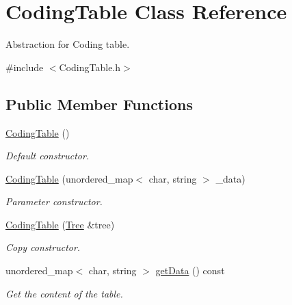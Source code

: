 \hypertarget{class_coding_table}{}\section{Coding\+Table Class Reference}
\label{class_coding_table}


Abstraction for Coding table.  




{\ttfamily \#include $<$Coding\+Table.\+h$>$}

\subsection*{Public Member Functions}
\begin{DoxyCompactItemize}
\item 
\mbox{\label{class_coding_table_aa084c590397a28dce6a1f30debb679af}} 
\mbox{\hyperlink{class_coding_table_aa084c590397a28dce6a1f30debb679af}{Coding\+Table}} ()
\begin{DoxyCompactList}\small\item\em Default constructor. \end{DoxyCompactList}\item 
\mbox{\label{class_coding_table_a9a0bd4c15ee8cc2f87c87835e56cc52f}} 
\mbox{\hyperlink{class_coding_table_a9a0bd4c15ee8cc2f87c87835e56cc52f}{Coding\+Table}} (unordered\+\_\+map$<$ char, string $>$ \+\_\+data)
\begin{DoxyCompactList}\small\item\em Parameter constructor. \end{DoxyCompactList}\item 
\mbox{\label{class_coding_table_a1bd8e80f18829b64f50abc1260a5273c}} 
\mbox{\hyperlink{class_coding_table_a1bd8e80f18829b64f50abc1260a5273c}{Coding\+Table}} (\mbox{\hyperlink{class_tree}{Tree}} \&tree)
\begin{DoxyCompactList}\small\item\em Copy constructor. \end{DoxyCompactList}\item 
unordered\+\_\+map$<$ char, string $>$ \mbox{\hyperlink{class_coding_table_af896cb49760b28f88dcc3524f4972058}{get\+Data}} () const
\begin{DoxyCompactList}\small\item\em Get the content of the table. \end{DoxyCompactList}\item 

\end{DoxyCompactItemize}
